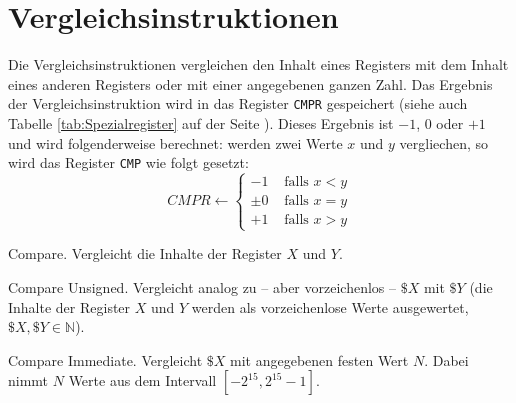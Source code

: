 \section{Vergleichsinstruktionen}
\label{sec:Vergleichsinstruktionen}

Die Vergleichsinstruktionen vergleichen den Inhalt eines Registers mit dem
Inhalt eines anderen Registers oder mit einer angegebenen ganzen Zahl. Das
Ergebnis der Vergleichsinstruktion wird in das Register \texttt{CMPR}
gespeichert (siehe auch Tabelle \ref{tab:Spezialregister} auf der Seite
\pageref{tab:Spezialregister}). Dieses Ergebnis ist $-1$, $0$ oder $+1$ und wird
folgenderweise berechnet: werden zwei Werte $x$ und $y$ vergliechen, so wird das
Register \texttt{CMP} wie folgt gesetzt:
\[
    CMPR \gets
    \begin{cases}
        -1 & \text{ falls } x < y  \\
     \pm 0 & \text{ falls } x = y  \\
        +1 & \text{ falls } x > y 
    \end{cases}
\]

\glqq Compare\grqq.
Vergleicht die Inhalte der Register $X$ und $Y$.


\glqq Compare Unsigned\grqq.
Vergleicht analog zu  -- aber vorzeichenlos -- $\$X$ mit $\$Y$
(die Inhalte der Register $X$ und $Y$ werden als vorzeichenlose Werte
ausgewertet, $\$X, \$Y \in \mathds{N}$).


\glqq Compare Immediate\grqq. 
Vergleicht $\$X$ mit angegebenen festen Wert $N$. Dabei nimmt $N$ Werte aus dem
Intervall $[-2^{15}, 2^{15}-1]$.


